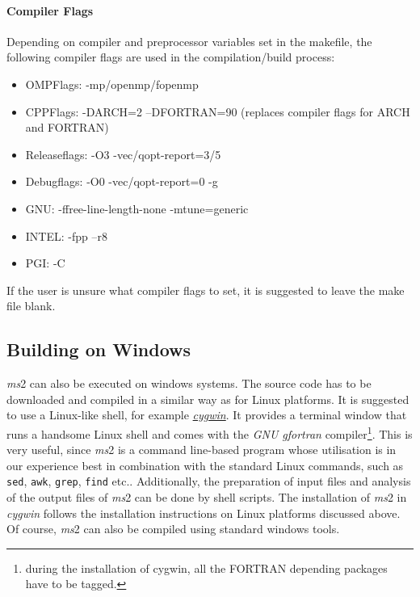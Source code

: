 \paragraph{Compiler Flags}


Depending on compiler and preprocessor variables set in the makefile, the following compiler flags are used in the compilation/build process:
\begin{itemize}
	\item[] OMPFlags: -mp/openmp/fopenmp
	\item[] CPPFlags: -DARCH=2 –DFORTRAN=90 (replaces compiler flags for ARCH and FORTRAN)
	\item[] Releaseflags: -O3 -vec/qopt-report=3/5
	\item[] Debugflags: -O0 -vec/qopt-report=0 -g
	\item[] GNU: -ffree-line-length-none -mtune=generic
	\item[] INTEL: -fpp –r8
	\item[] PGI: -C
\end{itemize}
If the user is unsure what compiler flags to set, it is suggested to leave the make file blank.



	




\subsection{Building on Windows}
\textit{ms}2 can also be executed on windows systems. The source code has to be downloaded and compiled in a similar way as for Linux platforms. It is suggested to use a Linux-like shell, for example \href{https://www.cygwin.com}{\textit{cygwin}}. It provides a terminal window that runs a handsome Linux shell and comes with the \textit{GNU gfortran} compiler\footnote{during the installation of cygwin, all the FORTRAN depending packages have to be tagged.}. This is very useful, since \textit{ms}2 is a command line-based program whose utilisation is in our experience best in combination with the standard Linux commands, such as \texttt{sed}, \texttt{awk}, \texttt{grep}, \texttt{find} etc.. Additionally, the preparation of input files and analysis of the output files of \textit{ms}2 can be done by shell scripts. The installation of \textit{ms}2 in \textit{cygwin} follows the installation instructions on Linux platforms discussed above. Of course, \textit{ms}2 can also be compiled using standard windows tools.



